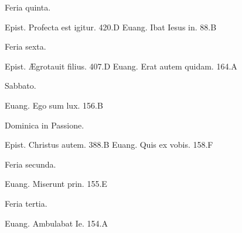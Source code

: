 \documentclass[a5paper,10pt]{book}
\def\AE{Æ}
\begin{document}
\begin{multicols}{2}
\begin{center}
\color{red} Feria quinta.
\end{center}
\vspace{-.75em}
\par \noindent Epist. Profecta est igitur. \hfill 420.D
\newline Euang. Ibat Iesus in. \hfill 88.B
\newline \vspace{-1.75em}
\begin{center}
\color{red} Feria sexta.
\end{center}
\vspace{-.75em}
\par \noindent Epist. \AE grotauit filius. \hfill 407.D
\newline Euang. Erat autem quidam. \hfill 164.A
\newline \vspace{-1.75em}
\begin{center}
\color{red} Sabbato.
\end{center}
\vspace{-.75em}
\par \noindent Euang. Ego sum lux. \hfill 156.B
\newline \vspace{-1.75em}
\begin{center}
\color{red} Dominica in Passione.
\end{center}
\vspace{-.75em}
\par \noindent Epist. Christus autem. \hfill 388.B
\newline Euang. Quis ex vobis. \hfill 158.F
\newline \vspace{-1.75em}
\begin{center}
\color{red} Feria secunda.
\end{center}
\vspace{-.75em}
\par \noindent Euang. Miserunt prin. \hfill 155.E
\newline \vspace{-1.75em}
\begin{center}
\color{red} Feria tertia.
\end{center}
\vspace{-.75em}
\par \noindent Euang. Ambulabat Ie. \hfill 154.A
\newline \vspace{-1.75em}
\begin{center}

\end{center}
\end{multicols}
\end{document}
